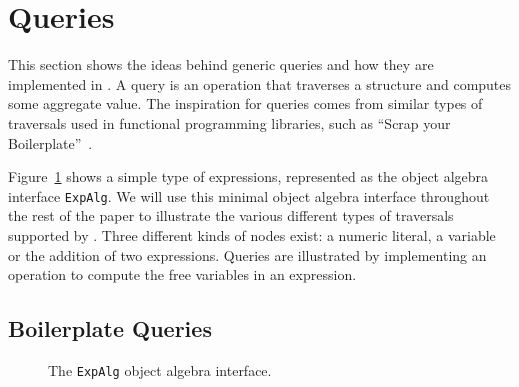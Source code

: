\section{Queries}\label{sec:queries}

This section shows the ideas behind generic queries and how they are
implemented in \Name.  A query is an operation that traverses a
structure and computes some aggregate value. The inspiration for
queries comes from similar types of traversals used in functional
programming libraries, such as ``Scrap your
Boilerplate''~\cite{ralf03syb}.


Figure~\ref{exp_alg} shows a simple type of expressions, represented
as the object algebra interface \lstinline{ExpAlg}. We will use this
minimal object algebra interface throughout the rest of the paper to
illustrate the various different types of traversals supported by
\Name.  Three different kinds of nodes exist: a numeric literal, a
variable or the addition of two expressions. Queries are illustrated
by implementing an operation to compute the free variables in an expression.

\begin{comment}
As a specific type of object algebras, queries allow users to define
new operations handling a user-defined data structure\bruno{This
  definition of queries is just too broad. Please
look at papers like Syb to see how they describe queries and transformations}. A \textit{query
  algebra} is a class implementing an object algebra interface by a
top-down traversal throughout the hierarchy. It is something
supporting the program to gather information from the substructures of
a data type recursively, and make a response at the root node to the
query.
\end{comment}

\subsection{Boilerplate Queries}\label{subsec:freevars}

\begin{figure}[!htbp]
\vspace{-.1in}
\caption{The \lstinline{ExpAlg} object algebra interface.}
\label{exp_alg}
\end{figure}

